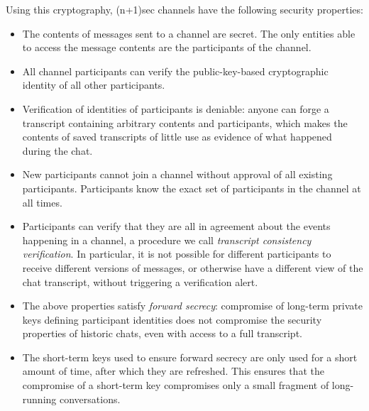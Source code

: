 \documentclass{article}
\begin{document}
Using this cryptography, (n+1)sec channels have the following security properties:
\begin{itemize}
\item The contents of messages sent to a channel are secret. The only entities able to access the message contents are the participants of the channel.
\item All channel participants can verify the public-key-based cryptographic identity of all other participants.
\item Verification of identities of participants is deniable: anyone can forge a transcript containing arbitrary contents and participants, which makes the contents of saved transcripts of little use as evidence of what happened during the chat.
\item New participants cannot join a channel without approval of all existing participants. Participants know the exact set of participants in the channel at all times.
\item Participants can verify that they are all in agreement about the events happening in a channel, a procedure we call \emph{transcript consistency verification}. In particular, it is not possible for different participants to receive different versions of messages, or otherwise have a different view of the chat transcript, without triggering a verification alert.
\item The above properties satisfy \emph{forward secrecy}: compromise of long-term private keys defining participant identities does not compromise the security properties of historic chats, even with access to a full transcript.
\item The short-term keys used to ensure forward secrecy are only used for a short amount of time, after which they are refreshed. This ensures that the compromise of a short-term key compromises only a small fragment of long-running conversations.
\end{itemize}
\end{document}
